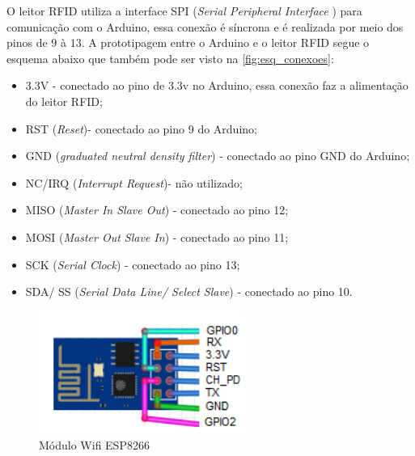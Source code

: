 \par
O leitor RFID utiliza a interface SPI (\textit{Serial Peripheral Interface} ) para comunicação com o Arduino, 
essa conexão é síncrona e é realizada por meio dos pinos de $9$ à $13$. A prototipagem entre o Arduino e o leitor RFID 
segue o esquema abaixo que também pode ser visto na \autoref{fig:esq_conexoes}:
\begin{itemize}
    \item 3.3V - conectado ao pino de 3.3v no Arduino, essa conexão faz a alimentação do leitor RFID;
    \item RST (\textit{Reset})- conectado ao pino 9 do Arduino;
    \item GND (\textit{graduated neutral density filter}) - conectado ao pino GND do Arduino;
    \item NC/IRQ (\textit{Interrupt Request})- não utilizado;
    \item MISO (\textit{Master In Slave Out}) - conectado ao pino 12;
    \item MOSI  (\textit{Master Out Slave In}) - conectado ao pino 11; 
    \item SCK  (\textit{Serial Clock}) - conectado ao pino 13;
    \item SDA/ SS (\textit{Serial Data Line/ Select Slave}) - conectado ao pino 10.
\end{itemize}


\begin{figure}[H]
              \caption{\label{fig:moduloWii}{Módulo Wifi ESP8266}}
              \centering
              \includegraphics[width=0.6\textwidth]{Figuras/Modulo_ESP8266.png}
\end{figure}

